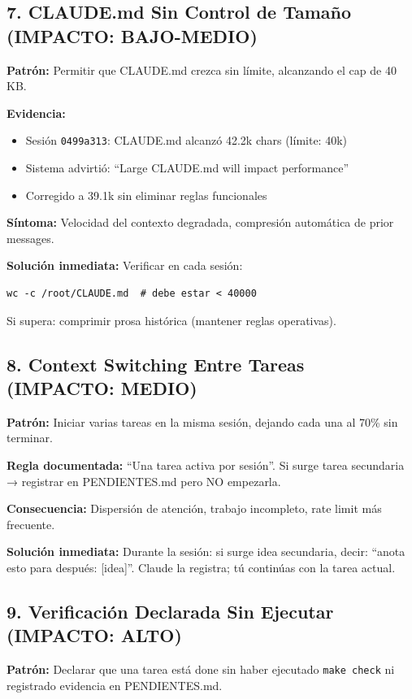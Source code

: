 \documentclass[12pt,a4paper,spanish]{article}
\begin{document}
\subsection{7. CLAUDE.md Sin Control de Tamaño (IMPACTO: BAJO-MEDIO)}

\textbf{Patrón:} Permitir que CLAUDE.md crezca sin límite, alcanzando el cap de 40 KB.

\textbf{Evidencia:}
\begin{itemize}
  \item Sesión \texttt{0499a313}: CLAUDE.md alcanzó 42.2k chars (límite: 40k)
  \item Sistema advirtió: ``Large CLAUDE.md will impact performance''
  \item Corregido a 39.1k sin eliminar reglas funcionales
\end{itemize}

\textbf{Síntoma:} Velocidad del contexto degradada, compresión automática de prior messages.

\textbf{Solución inmediata:}
Verificar en cada sesión:
\begin{lstlisting}
wc -c /root/CLAUDE.md  # debe estar < 40000
\end{lstlisting}
Si supera: comprimir prosa histórica (mantener reglas operativas).

\subsection{8. Context Switching Entre Tareas (IMPACTO: MEDIO)}

\textbf{Patrón:} Iniciar varias tareas en la misma sesión, dejando cada una al 70\% sin terminar.

\textbf{Regla documentada:} ``Una tarea activa por sesión''. Si surge tarea secundaria → registrar en PENDIENTES.md pero NO empezarla.

\textbf{Consecuencia:} Dispersión de atención, trabajo incompleto, rate limit más frecuente.

\textbf{Solución inmediata:}
Durante la sesión: si surge idea secundaria, decir: ``anota esto para después: [idea]''. Claude la registra; tú continúas con la tarea actual.

\subsection{9. Verificación Declarada Sin Ejecutar (IMPACTO: ALTO)}

\textbf{Patrón:} Declarar que una tarea está done sin haber ejecutado \texttt{make check} ni registrado evidencia en PENDIENTES.md.
\end{document}
